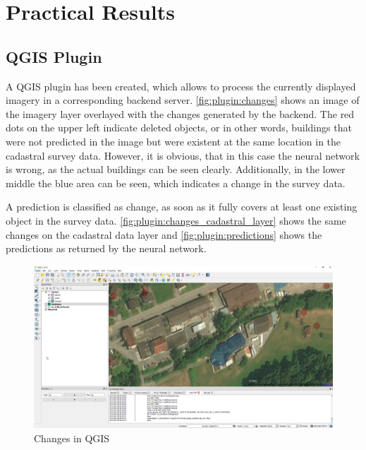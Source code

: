 
\chapter{Practical Results}\label{chp:practical_results}

\section{QGIS Plugin}
A QGIS plugin has been created, which allows to process the currently displayed imagery in a corresponding backend server. \autoref{fig:plugin:changes} shows an image of the imagery layer overlayed with the changes generated by the backend. The red dots on the upper left indicate deleted objects, or in other words, buildings that were not predicted in the image but were existent at the same location in the cadastral survey data. However, it is obvious, that in this case the neural network is wrong, as the actual buildings can be seen clearly. Additionally, in the lower middle the blue area can be seen, which indicates a change in the survey data.

A prediction is classified as change, as soon as it fully covers at least one existing object in the survey data. \autoref{fig:plugin:changes_cadastral_layer} shows the same changes on the cadastral data layer and \autoref{fig:plugin:predictions} shows the predictions as returned by the neural network.

\begin{figure}[H]
    \centering
	\includegraphics[width=1\linewidth]{chapters/practical_results/images/qgis_changes_aerial.png}
	\caption{Changes in QGIS}
	\label{fig:plugin:changes}
\end{figure}

